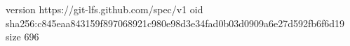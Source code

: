 version https://git-lfs.github.com/spec/v1
oid sha256:c845eaa843159f897068921c980e98d3e34fad0b03d0909a6e27d592fb6f6d19
size 696
